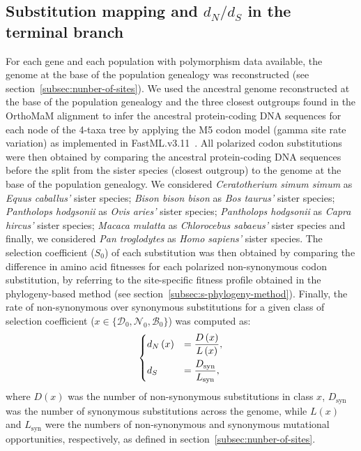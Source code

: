 \documentclass[12pt]{article}
\newcommand{\dn}{d_N}
\newcommand{\ds}{d_S}
\newcommand{\dnds}{\dn / \ds}
\newcommand{\Sphy}{S_{0}}
\newcommand{\SphyDel}{\mathcal{D}_0}
\newcommand{\SphyNeu}{\mathcal{N}_0}
\newcommand{\SphyBen}{\mathcal{B}_0}
\newcommand{\Sphyclass}{x}
\begin{document}
    \subsection{Substitution mapping and $\dnds$ in the terminal branch}
    \label{subsec:substitution-mapping-in-the-terminal-branch}
    For each gene and each population with polymorphism data available, the genome at the base of the population genealogy was reconstructed (see section~\ref{subsec:nunber-of-sites}).
    We used the ancestral genome reconstructed at the base of the population genealogy and the three closest outgroups found in the OrthoMaM alignment to infer the ancestral protein-coding DNA sequences for each node of the 4-taxa tree by applying the M5 codon model (gamma site rate variation) as implemented in FastML.v3.11~\cite{ashkenazy_fastml_2012}.
    All polarized codon substitutions were then obtained by comparing the ancestral protein-coding DNA sequences before the split from the sister species (closest outgroup) to the genome at the base of the population genealogy.
    We considered \textit{Ceratotherium simum simum} as \textit{Equus caballus'} sister species; \textit{Bison bison bison} as \textit{Bos taurus'} sister species; \textit{Pantholops hodgsonii} as \textit{Ovis aries'} sister species; \textit{Pantholops hodgsonii} as \textit{Capra hircus'} sister species; \textit{Macaca mulatta} as \textit{Chlorocebus sabaeus'} sister species and finally, we considered \textit{Pan troglodytes} as \textit{Homo sapiens'} sister species.
    The selection coefficient ($\Sphy$) of each substitution was then obtained by comparing the difference in amino acid fitnesses for each polarized non-synonymous codon substitution, by referring to the site-specific fitness profile obtained in the phylogeny-based method (see section~\ref{subsec:s-phylogeny-method}).
    Finally, the rate of non-synonymous over synonymous substitutions for a given class of selection coefficient ($\Sphyclass \in \{\SphyDel, \SphyNeu, \SphyBen \}$) was computed as:
    \begin{align}
        \begin{dcases}
            \dn \left( \Sphyclass \right) &= \dfrac{D\left( \Sphyclass \right)}{L \left( \Sphyclass \right)}, \\
            \ds &= \dfrac{D_{\text{syn}}}{L_{\text{syn}}},
        \end{dcases}\label{eq:dnds}
    \end{align}
    where $D \left( \Sphyclass \right) $ was the number of non-synonymous substitutions in class $\Sphyclass$, $D_{\text{syn}}$ was the number of synonymous substitutions across the genome, while $L \left( \Sphyclass \right)$ and $L_{\text{syn}}$ were the numbers of non-synonymous and synonymous mutational opportunities, respectively, as defined in section~\ref{subsec:nunber-of-sites}.
\end{document}
